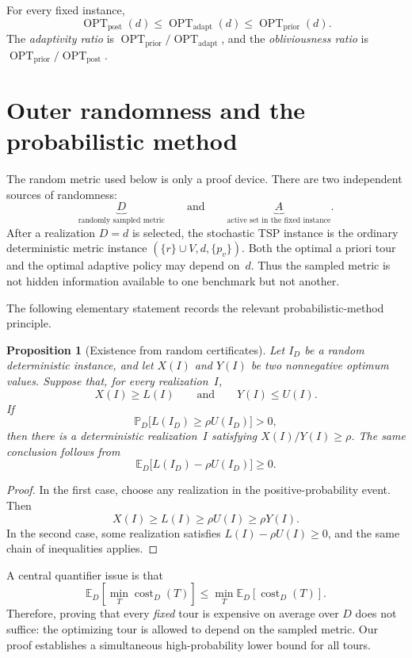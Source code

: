 \documentclass[11pt]{article}
\newtheorem{proposition}[theorem]{Proposition}
\theoremstyle{remark}
\newcommand{\E}{\mathbb{E}}
\newcommand{\Prob}{\mathbb{P}}
\newcommand{\cost}{\operatorname{cost}}
\newcommand{\optpost}{\operatorname{OPT}_{\mathrm{post}}}
\newcommand{\optadapt}{\operatorname{OPT}_{\mathrm{adapt}}}
\newcommand{\optprior}{\operatorname{OPT}_{\mathrm{prior}}}
\begin{document}
For every fixed instance,
\[
    \optpost(d)\leq \optadapt(d)\leq \optprior(d).
\]
The \emph{adaptivity ratio} is $\optprior/\optadapt$, and the
\emph{obliviousness ratio} is $\optprior/\optpost$.

\section{Outer randomness and the probabilistic method}

The random metric used below is only a proof device.  There are two independent
sources of randomness:
\[
    \underbrace{D}_{\text{randomly sampled metric}}
    \qquad\text{and}\qquad
    \underbrace{A}_{\text{active set in the fixed instance}}.
\]
After a realization $D=d$ is selected, the stochastic TSP instance is the
ordinary deterministic metric instance $(\{r\}\cup V,d,\{p_v\})$.  Both the
optimal a priori tour and the optimal adaptive policy may depend on~$d$.
Thus the sampled metric is not hidden information available to one benchmark
but not another.

The following elementary statement records the relevant probabilistic-method
principle.

\begin{proposition}[Existence from random certificates]\label{prop:method}
Let $I_D$ be a random deterministic instance, and let $X(I)$ and $Y(I)$ be two
nonnegative optimum values.  Suppose that, for every realization~$I$,
\[
    X(I)\geq L(I)
    \qquad\text{and}\qquad
    Y(I)\leq U(I).
\]
If
\[
    \Prob_D\bigl[L(I_D)\geq \rho U(I_D)\bigr]>0,
\]
then there is a deterministic realization~$I$ satisfying
$X(I)/Y(I)\geq\rho$.  The same conclusion follows from
\[
    \E_D\bigl[L(I_D)-\rho U(I_D)\bigr]\geq 0.
\]
\end{proposition}

\begin{proof}
In the first case, choose any realization in the positive-probability event.
Then
\[
    X(I)\geq L(I)\geq \rho U(I)\geq \rho Y(I).
\]
In the second case, some realization satisfies
$L(I)-\rho U(I)\geq0$, and the same chain of inequalities applies.
\end{proof}

A central quantifier issue is that
\[
    \E_D\!\left[\min_T \cost_D(T)\right]
    \leq
    \min_T \E_D\!\left[\cost_D(T)\right].
\]
Therefore, proving that every \emph{fixed} tour is expensive on average over
$D$ does not suffice: the optimizing tour is allowed to depend on the sampled
metric.  Our proof establishes a simultaneous high-probability lower bound for
all tours.
\end{document}
